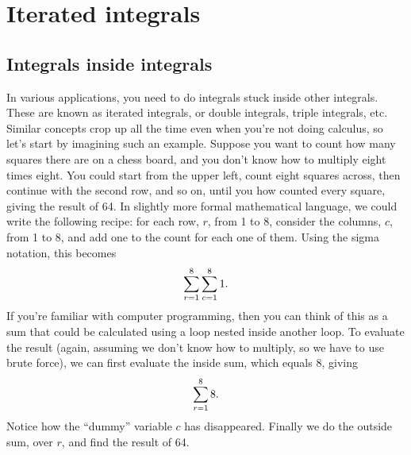 \chapter{Iterated integrals}\label{ch:iterated-int}

\section{Integrals inside integrals}

In various applications, you need to do
integrals stuck inside other integrals. These are known as
iterated integrals, or double integrals, triple integrals, etc. Similar concepts
crop up all the time even when you're not doing calculus, so let's start by
imagining such an example. Suppose you want to count how many squares there are
on a chess board, and you don't know how to multiply eight times eight. You
could start from the upper left, count eight squares across, then continue with
the second row, and so on, until you how counted every square, giving the result
of 64. In slightly more formal mathematical language, we could write the following
recipe: for each row, $r$, from 1 to 8, consider the columns, $c$, from 1 to 8,
and add one to the count for each one of them. Using the sigma notation, this
becomes
\begin{equation*}
  \sum_{r=1}^8 \sum_{c=1}^8 1.
\end{equation*}
If you're familiar with computer programming, then you can think of this as
a sum that could be calculated using a loop nested inside another loop.
To evaluate the result (again, assuming we don't know how to multiply, so we
have to use brute force), we can first evaluate the inside sum, which equals
8, giving
\begin{equation*}
  \sum_{r=1}^8 8.
\end{equation*}
Notice how the ``dummy'' variable $c$ has disappeared. Finally we do the outside
sum, over $r$, and find the result of 64.

